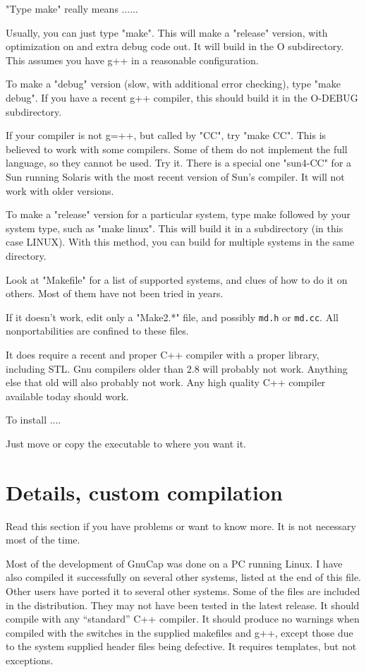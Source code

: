 "Type make" really means ......

Usually, you can just type "make".  This will make a "release"
version, with optimization on and extra debug code out.  It will build
in the O subdirectory.  This assumes you have g++ in a reasonable
configuration.

To make a "debug" version (slow, with additional error checking), type
"make debug".  If you have a recent g++ compiler, this should build it
in the O-DEBUG subdirectory.

If your compiler is not g=++, but called by "CC", try "make CC".  This
is believed to work with some compilers.  Some of them do not
implement the full language, so they cannot be used.  Try it.  There
is a special one "sun4-CC" for a Sun running Solaris with the most
recent version of Sun's compiler.  It will not work with older
versions.

To make a "release" version for a particular system, type make
followed by your system type, such as "make linux".  This will build
it in a subdirectory (in this case LINUX).  With this method, you can
build for multiple systems in the same directory.

Look at "Makefile" for a list of supported systems, and clues of how
to do it on others.  Most of them have not been tried in years.

If it doesn't work, edit only a "Make2.*" file, and possibly {\tt md.h} or
{\tt md.cc}.  All nonportabilities are confined to these files.

It does require a recent and proper C++ compiler with a proper
library, including STL.  Gnu compilers older than 2.8 will probably
not work.  Anything else that old will also probably not work.  Any
high quality C++ compiler available today should work.

To install ....

Just move or copy the executable to where you want it.

\section{Details, custom compilation}

Read this section if you have problems or want to know more.  It is
not necessary most of the time.

Most of the development of GnuCap was done on a PC running Linux.  I have
also compiled it successfully on several other systems, listed at the
end of this file.  Other users have ported it to several other
systems.  Some of the files are included in the distribution.  They
may not have been tested in the latest release.  It should compile
with any ``standard'' C++ compiler.  It should produce no warnings when
compiled with the switches in the supplied makefiles and g++, except
those due to the system supplied header files being defective.  It
requires templates, but not exceptions.

